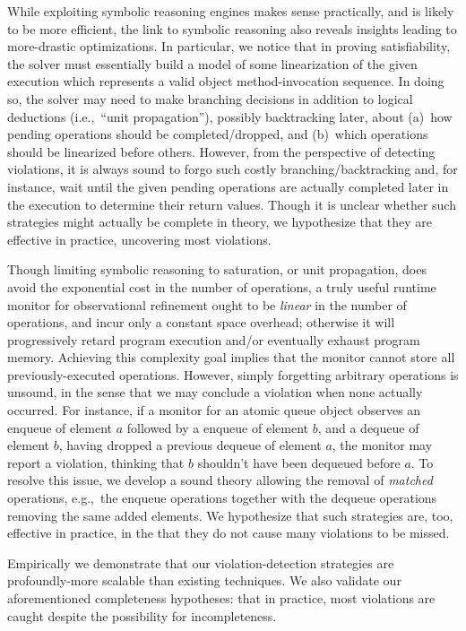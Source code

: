 While exploiting symbolic reasoning engines makes sense practically, and is
likely to be more efficient, the link to symbolic reasoning also reveals
insights leading to more-drastic optimizations. In particular, we notice that
in proving satisfiability, the solver must essentially build a model of some
linearization of the given execution which represents a valid object
method-invocation sequence. In doing so, the solver may need to make branching
decisions in addition to logical deductions (i.e.,~``unit propagation''),
possibly backtracking later, about (a)~how pending operations should be
completed/dropped, and (b)~which operations should be linearized before others.
However, from the perspective of detecting violations, it is always sound to
forgo such costly branching/backtracking and, for instance, wait until the
given pending operations are actually completed later in the execution to
determine their return values. Though it is unclear whether such strategies
might actually be complete in theory, we hypothesize that they are effective in
practice, uncovering most violations.

Though limiting symbolic reasoning to saturation, or unit propagation, does
avoid the exponential cost in the number of operations, a truly useful runtime
monitor for observational refinement ought to be \emph{linear} in the number of
operations, and incur only a constant space overhead; otherwise it will
progressively retard program execution and/or eventually exhaust program
memory. Achieving this complexity goal implies that the monitor cannot store
all previously-executed operations. However, simply forgetting arbitrary
operations is unsound, in the sense that we may conclude a violation when none
actually occurred. For instance, if a monitor for an atomic queue object
observes an enqueue of element $a$ followed by a enqueue of element $b$, and a
dequeue of element $b$, having dropped a previous dequeue of element $a$, the
monitor may report a violation, thinking that $b$ shouldn't have been dequeued
before $a$. To resolve this issue, we develop a sound theory allowing the
removal of \emph{matched} operations, e.g.,~the enqueue operations together
with the dequeue operations removing the same added elements. We hypothesize
that such strategies are, too, effective in practice, in the that they do not
cause many violations to be missed.

Empirically we demonstrate that our violation-detection strategies are
profoundly-more scalable than existing techniques. We also validate our
aforementioned completeness hypotheses: that in practice, most violations are
caught despite the possibility for incompleteness.

